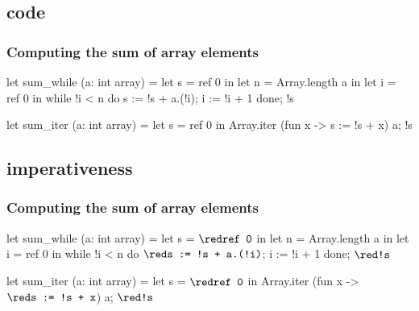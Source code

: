 \documentclass[xcolor=dvipsnames]{beamer}
\begin{document}
\subsection*{code}
\begin{frame}[fragile]\frametitle{Computing the sum of array elements}
\begin{adjustwidth}{-0.3cm}{1.0cm}
\begin{small}
\begin{minipage}[t]{0.4\textwidth}
\begin{whycode}  
let sum_while (a: int array)
= let s = ref 0 in
  let n = Array.length a in
  let i = ref 0 in
  while !i < n do
    s := !s + a.(!i);
    i := !i + 1
  done;
  !s
\end{whycode}
\end{minipage}\hfill
\begin{minipage}[t]{0.4\textwidth}
\begin{whycode} 
let sum_iter (a: int array)
= let s = ref 0 in
  Array.iter 
    (fun x -> s := !s + x) a;
  !s
\end{whycode}	
\end{minipage}
\end{small}
\end{adjustwidth}
\end{frame}
\addtocounter{framenumber}{-1}

\subsection*{imperativeness}
\begin{frame}[fragile]\frametitle{Computing the sum of array elements}
\begin{adjustwidth}{-0.3cm}{1.0cm}
\begin{small}
\begin{minipage}[t]{0.4\textwidth}
\begin{whycode}  
let sum_while (a: int array)
= let s = ${\red \texttt{ref 0}}$ in
  let n = Array.length a in
  let i = ref 0 in
  while !i < n do
    ${\red \texttt{s := !s + a.(!i)}}$;
    i := !i + 1
  done;
  ${\red \texttt{!s}}$
\end{whycode}
\end{minipage}\hfill
\begin{minipage}[t]{0.4\textwidth}
\begin{whycode} 
let sum_iter (a: int array)
= let s = ${\red \texttt{ref 0}}$ in
  Array.iter 
    (fun x -> ${\red \texttt{s := !s + x}}$) a;
  ${\red \texttt{!s}}$
\end{whycode}	
\end{minipage}
\end{small}
\end{adjustwidth}
\end{frame}
\addtocounter{framenumber}{-1}
\end{document}
